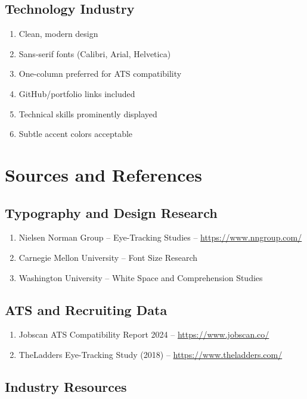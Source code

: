 \documentclass[11pt,a4paper]{article}
\begin{document}
\subsection{Technology Industry}

\begin{enumerate}
    \item[$\square$] Clean, modern design
    \item[$\square$] Sans-serif fonts (Calibri, Arial, Helvetica)
    \item[$\square$] One-column preferred for ATS compatibility
    \item[$\square$] GitHub/portfolio links included
    \item[$\square$] Technical skills prominently displayed
    \item[$\square$] Subtle accent colors acceptable
\end{enumerate}

\section{Sources and References}

\subsection{Typography and Design Research}

\begin{enumerate}
    \item Nielsen Norman Group -- Eye-Tracking Studies -- \url{https://www.nngroup.com/}
    \item Carnegie Mellon University -- Font Size Research
    \item Washington University -- White Space and Comprehension Studies
\end{enumerate}

\subsection{ATS and Recruiting Data}

\begin{enumerate}
    \item Jobscan ATS Compatibility Report 2024 -- \url{https://www.jobscan.co/}
    \item TheLadders Eye-Tracking Study (2018) -- \url{https://www.theladders.com/}
\end{enumerate}

\subsection{Industry Resources}
\end{document}
